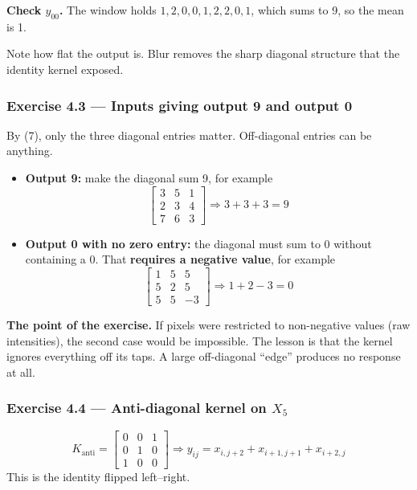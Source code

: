 \textbf{Check $y_{00}$.} The window holds $1,2,0,0,1,2,2,0,1$, which sums to 9, so the mean is 1.

Note how flat the output is. Blur removes the sharp diagonal structure that the identity kernel exposed.

\subsubsection*{Exercise 4.3 --- Inputs giving output 9 and output 0}

By (7), only the three diagonal entries matter. Off-diagonal entries can be anything.
\begin{itemize}
  \item \textbf{Output 9:} make the diagonal sum 9, for example
  \[
  \begin{bmatrix}3&5&1\\2&3&4\\7&6&3\end{bmatrix} \Rightarrow 3+3+3 = 9
  \]
  \item \textbf{Output 0 with no zero entry:} the diagonal must sum to 0 without containing a 0. That \textbf{requires a negative value}, for example
  \[
  \begin{bmatrix}1&5&5\\5&2&5\\5&5&-3\end{bmatrix} \Rightarrow 1+2-3 = 0
  \]
\end{itemize}

\textbf{The point of the exercise.} If pixels were restricted to non-negative values (raw intensities), the second case would be impossible. The lesson is that the kernel ignores everything off its taps. A large off-diagonal ``edge'' produces no response at all.

\subsubsection*{Exercise 4.4 --- Anti-diagonal kernel on $X_5$}

\[
K_{\text{anti}} = \begin{bmatrix}0&0&1\\0&1&0\\1&0&0\end{bmatrix} \Rightarrow y_{ij} = x_{i,j+2} + x_{i+1,j+1} + x_{i+2,j}
\]
This is the identity flipped left--right.

